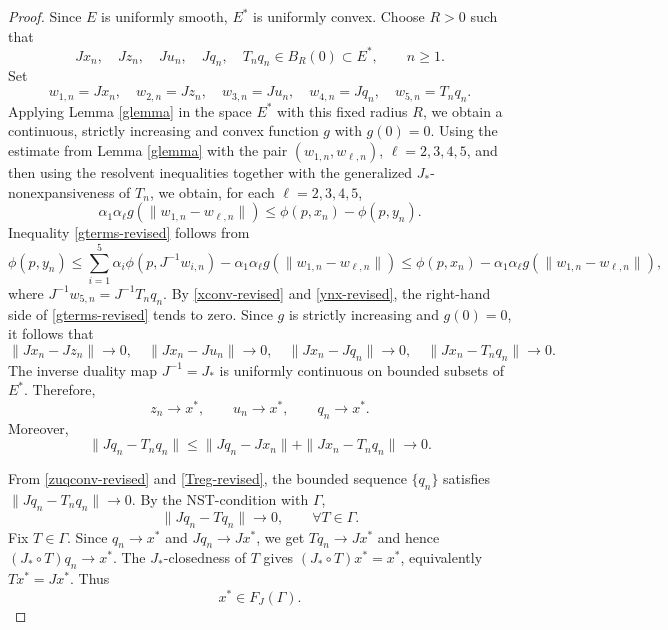 \documentclass[10pt,a4paper]{amsart}
\numberwithin{equation}{section}
\begin{document}
\begin{proof}
Since $E$ is uniformly smooth, $E^{*}$ is uniformly convex. Choose $R>0$ such that
\[
Jx_n,\quad Jz_n,\quad Ju_n,\quad Jq_n,\quad T_nq_n\in B_R(0)\subset E^{*},
\qquad n\geq1.
\]
Set
\[
w_{1,n}=Jx_n,\quad w_{2,n}=Jz_n,\quad w_{3,n}=Ju_n,\quad
w_{4,n}=Jq_n,\quad w_{5,n}=T_nq_n.
\]
Applying Lemma \ref{glemma} in the space $E^{*}$ with this fixed radius $R$, we obtain a continuous, strictly increasing and convex function $g$ with $g(0)=0$. Using the estimate from Lemma \ref{glemma} with the pair $(w_{1,n},w_{\ell,n})$, $\ell=2,3,4,5$, and then using the resolvent inequalities together with the generalized $J_{*}$-nonexpansiveness of $T_n$, we obtain, for each $\ell=2,3,4,5$,
\begin{equation}\label{gterms-revised}
\alpha_1\alpha_{\ell} g(\|w_{1,n}-w_{\ell,n}\|)
\leq \phi(p,x_n)-\phi(p,y_n).
\end{equation}
Inequality \eqref{gterms-revised} follows from
\[
\phi(p,y_n)
\leq \sum_{i=1}^{5}\alpha_i\phi(p,J^{-1}w_{i,n})
      -\alpha_1\alpha_{\ell}g(\|w_{1,n}-w_{\ell,n}\|)
\leq \phi(p,x_n)-\alpha_1\alpha_{\ell}g(\|w_{1,n}-w_{\ell,n}\|),
\]
where $J^{-1}w_{5,n}=J^{-1}T_nq_n$.
By \eqref{xconv-revised} and \eqref{ynx-revised}, the right-hand side of \eqref{gterms-revised} tends to zero. Since $g$ is strictly increasing and $g(0)=0$, it follows that
\[
\|Jx_n-Jz_n\|\to0,\quad \|Jx_n-Ju_n\|\to0,\quad
\|Jx_n-Jq_n\|\to0,\quad \|Jx_n-T_nq_n\|\to0.
\]
The inverse duality map $J^{-1}=J_{*}$ is uniformly continuous on bounded subsets of $E^{*}$. Therefore,
\begin{equation}\label{zuqconv-revised}
z_n\to x^{*},\qquad u_n\to x^{*},\qquad q_n\to x^{*}.
\end{equation}
Moreover,
\begin{equation}\label{Treg-revised}
\|Jq_n-T_nq_n\|\leq \|Jq_n-Jx_n\|+\|Jx_n-T_nq_n\|\to0.
\end{equation}

From \eqref{zuqconv-revised} and \eqref{Treg-revised}, the bounded sequence $\{q_n\}$ satisfies $\|Jq_n-T_nq_n\|\to0$. By the NST-condition with $\Gamma$,
\[
\|Jq_n-Tq_n\|\to0,\qquad \forall T\in\Gamma.
\]
Fix $T\in\Gamma$. Since $q_n\to x^{*}$ and $Jq_n\to Jx^{*}$, we get $Tq_n\to Jx^{*}$ and hence $(J_{*}\circ T)q_n\to x^{*}$. The $J_{*}$-closedness of $T$ gives $(J_{*}\circ T)x^{*}=x^{*}$, equivalently $Tx^{*}=Jx^{*}$. Thus
\begin{equation}\label{xFJ-revised}
x^{*}\in F_J(\Gamma).
\end{equation}



\end{proof}
\end{document}
